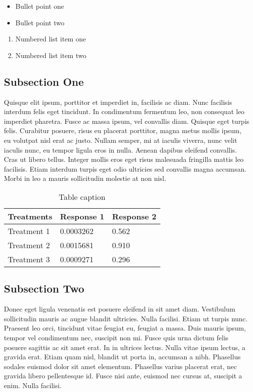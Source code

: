 \documentclass[preprint,12pt,times]{elsarticle}
\begin{document}
	\begin{itemize}
		\item Bullet point one
		\item Bullet point two
	\end{itemize}

	\begin{enumerate}
		\item Numbered list item one
		\item Numbered list item two
	\end{enumerate}

	\subsection{Subsection One}

	Quisque elit ipsum, porttitor et imperdiet in, facilisis ac diam. Nunc facilisis interdum felis eget tincidunt. In condimentum fermentum leo, non consequat leo imperdiet pharetra. Fusce ac massa ipsum, vel convallis diam. Quisque eget turpis felis. Curabitur posuere, risus eu placerat porttitor, magna metus mollis ipsum, eu volutpat nisl erat ac justo. Nullam semper, mi at iaculis viverra, nunc velit iaculis nunc, eu tempor ligula eros in nulla. Aenean dapibus eleifend convallis. Cras ut libero tellus. Integer mollis eros eget risus malesuada fringilla mattis leo facilisis. Etiam interdum turpis eget odio ultricies sed convallis magna accumsan. Morbi in leo a mauris sollicitudin molestie at non nisl.

	\begin{table}[h]
		\centering
		\begin{tabular}{l l l}
			\hline
			\textbf{Treatments} & \textbf{Response 1} & \textbf{Response 2}\\
			\hline
			Treatment 1 & 0.0003262 & 0.562 \\
			Treatment 2 & 0.0015681 & 0.910 \\
			Treatment 3 & 0.0009271 & 0.296 \\
			\hline
		\end{tabular}
		\caption{Table caption}
	\end{table}

	\subsection{Subsection Two}

	Donec eget ligula venenatis est posuere eleifend in sit amet diam. Vestibulum sollicitudin mauris ac augue blandit ultricies. Nulla facilisi. Etiam ut turpis nunc. Praesent leo orci, tincidunt vitae feugiat eu, feugiat a massa. Duis mauris ipsum, tempor vel condimentum nec, suscipit non mi. Fusce quis urna dictum felis posuere sagittis ac sit amet erat. In in ultrices lectus. Nulla vitae ipsum lectus, a gravida erat. Etiam quam nisl, blandit ut porta in, accumsan a nibh. Phasellus sodales euismod dolor sit amet elementum. Phasellus varius placerat erat, nec gravida libero pellentesque id. Fusce nisi ante, euismod nec cursus at, suscipit a enim. Nulla facilisi.
\end{document}
